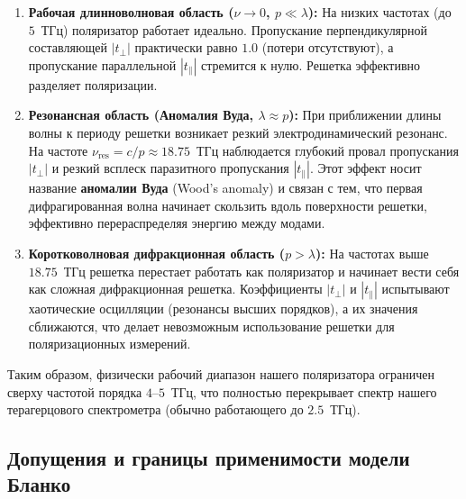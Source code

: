 \begin{enumerate}
    \item \textbf{Рабочая длинноволновая область ($\nu \to 0$, $p \ll \lambda$):}
    На низких частотах (до $5$~ТГц) поляризатор работает идеально. Пропускание перпендикулярной составляющей $|t_\perp|$ практически равно $1.0$ (потери отсутствуют), а пропускание параллельной $|t_\parallel|$ стремится к нулю. Решетка эффективно разделяет поляризации.
    
    \item \textbf{Резонансная область (Аномалия Вуда, $\lambda \approx p$):}
    При приближении длины волны к периоду решетки возникает резкий электродинамический резонанс. На частоте $\nu_{\text{res}} = c/p \approx 18.75$~ТГц наблюдается глубокий провал пропускания $|t_\perp|$ и резкий всплеск паразитного пропускания $|t_\parallel|$. Этот эффект носит название \textbf{аномалии Вуда} (Wood's anomaly) и связан с тем, что первая дифрагированная волна начинает скользить вдоль поверхности решетки, эффективно перераспределяя энергию между модами.
    
    \item \textbf{Коротковолновая дифракционная область ($p > \lambda$):}
    На частотах выше $18.75$~ТГц решетка перестает работать как поляризатор и начинает вести себя как сложная дифракционная решетка. Коэффициенты $|t_\perp|$ и $|t_\parallel|$ испытывают хаотические осцилляции (резонансы высших порядков), а их значения сближаются, что делает невозможным использование решетки для поляризационных измерений.
\end{enumerate}

Таким образом, физически рабочий диапазон нашего поляризатора ограничен сверху частотой порядка $4$--$5$~ТГц, что полностью перекрывает спектр нашего терагерцового спектрометра (обычно работающего до $2.5$~ТГц).

\subsection{Допущения и границы применимости модели Бланко}

